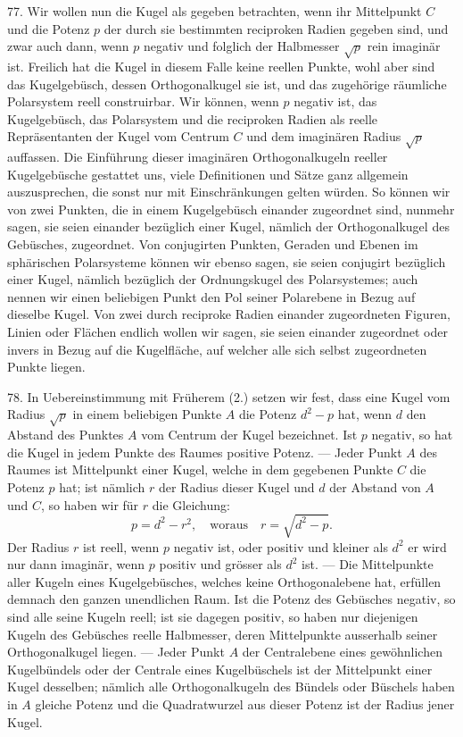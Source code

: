 77. Wir wollen nun die Kugel als gegeben betrachten,
wenn ihr Mittelpunkt $C$ und die Potenz $p$ der durch sie bestimmten
reciproken Radien gegeben sind, und zwar auch
dann, wenn $p$ negativ und folglich der Halbmesser $\sqrt{p}$ rein
imagin\"ar ist. Freilich hat die Kugel in diesem Falle keine
reellen Punkte, wohl aber sind das Kugelgeb\"usch, dessen
Orthogonalkugel sie ist, und das zugeh\"orige r\"aumliche Polarsystem
reell construirbar. Wir k\"onnen, wenn $p$ negativ
ist, das Kugelgeb\"usch, das Polarsystem und die reciproken
Radien als reelle Repr\"asentanten der Kugel vom Centrum $C$
und dem imagin\"aren Radius $\sqrt{p}$ auf\/fassen. Die Einf\"uhrung
dieser imagin\"aren Orthogonalkugeln reeller Kugelgeb\"usche
gestattet uns, viele Definitionen und S\"atze ganz allgemein
auszusprechen, die sonst nur mit Einschr\"ankungen gelten
w\"urden. So k\"onnen wir von zwei Punkten, die in einem
Kugelgeb\"usch einander zugeordnet sind, nunmehr sagen, sie
seien einander {\glqq}bez\"uglich einer Kugel{\grqq}, n\"amlich der Orthogonalkugel
des Geb\"usches, zugeordnet. Von conjugirten Punkten,
Geraden und Ebenen im sph\"arischen Polarsysteme k\"onnen
wir ebenso sagen, sie seien conjugirt {\glqq}bez\"uglich einer
Kugel{\grqq}, n\"amlich bez\"uglich der Ordnungskugel des Polarsystemes;
auch nennen wir einen beliebigen Punkt den Pol
seiner Polarebene in Bezug auf dieselbe Kugel. Von zwei
durch reciproke Radien einander zugeordneten Figuren, Linien
oder Fl\"achen endlich wollen wir sagen, sie seien einander
zugeordnet oder invers {\glqq}in Bezug auf die Kugelfl\"ache{\grqq},
auf welcher alle sich selbst zugeordneten Punkte liegen.

78. In Uebereinstimmung mit Fr\"uherem (2.) setzen wir
fest, dass eine Kugel vom Radius $\sqrt{p}$ in einem beliebigen
Punkte $A$ die Potenz $d^2-p$ hat, wenn $d$ den Abstand des
Punktes $A$ vom Centrum der Kugel bezeichnet. Ist $p$ negativ,
so hat die Kugel in jedem Punkte des Raumes positive
Potenz. --- Jeder Punkt $A$ des Raumes ist Mittelpunkt einer
Kugel, welche in dem gegebenen Punkte $C$ die Potenz $p$ hat;
ist n\"amlich $r$ der Radius dieser Kugel und $d$ der Abstand
von $A$ und $C$, so haben wir f\"ur $r$ die Gleichung:
\[
p = d^2 - r^2, \quad\text{woraus}\quad r = \sqrt{d^2 -p}.
\]
Der Radius $r$ ist reell, wenn $p$ negativ ist, oder positiv und
kleiner als $d^2$ er wird nur dann imagin\"ar, wenn $p$ positiv
und gr\"osser als $d^2$ ist. --- Die Mittelpunkte aller Kugeln
eines Kugelgeb\"usches, welches keine Orthogonalebene hat,
erf\"ullen demnach den ganzen unendlichen Raum. Ist die
Potenz des Geb\"usches negativ, so sind alle seine Kugeln
reell; ist sie dagegen positiv, so haben nur diejenigen Kugeln
des Geb\"usches reelle Halbmesser, deren Mittelpunkte ausserhalb
seiner Orthogonalkugel liegen. --- Jeder Punkt $A$ der
Centralebene eines gew\"ohnlichen Kugelb\"undels oder der Centrale
eines Kugelb\"uschels ist der Mittelpunkt einer Kugel
desselben; n\"amlich alle Orthogonalkugeln des B\"undels oder
B\"uschels haben in $A$ gleiche Potenz und die Quadratwurzel
aus dieser Potenz ist der Radius jener Kugel.

